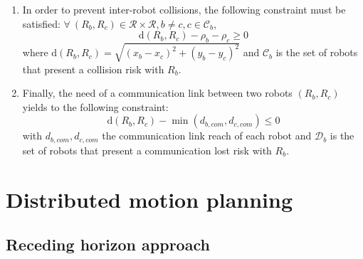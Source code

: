 \documentclass[eprint]{actapoly}
\begin{document}
\begin{enumerate}
    \item 
    In order to prevent inter-robot collisions, the following constraint must be satisfied:
    $\forall\ (R_b, R_c) \in \mathcal{R} \times \mathcal{R}, b\neq c, c \in \mathcal{C}_b$,
    \begin{equation}\label{eq:coll}
	    \mathrm{d}(R_b,R_c) - \rho_b -\rho_c \geq 0
    \end{equation}
    where $\mathrm{d}(R_b,R_c) = \sqrt{(x_{b} - x_{c})^2 + (y_{b} - y_{c})^2}$ and
    $\mathcal{C}_b$ is the set of robots that present a collision risk with
    $R_b$.
    
    \item Finally, the need of a communication link between two robots $(R_b, R_c)$ yields to
    the following constraint:
    \begin{equation}\label{eq:com}
    	\mathrm{d}(R_b,R_c)  - \min(d_{b,com}, d_{c,com}) \leq 0
    \end{equation}
    with $d_{b,com}, d_{c,com}$ the communication link reach of each robot and
    $\mathcal{D}_b$ is the set of robots that present a communication lost risk with
    $R_b$.
\end{enumerate}



\section{Distributed motion planning}



\subsection{Receding horizon approach}\label{subsec:rha}

\end{document}
